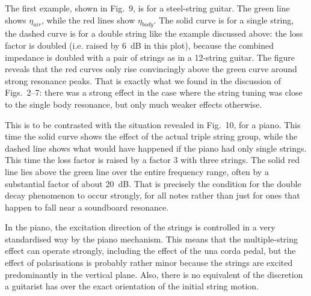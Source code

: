   The first example, shown in Fig.\ 9, is for a steel-string guitar. The green 
  line shows $\eta_{air}$, while the red lines show $\eta_{body}$. The solid 
  curve is for a single string, the dashed curve is for a double string like 
  the example discussed above: the loss factor is doubled (i.e. raised by 6~dB 
  in this plot), because the combined impedance is doubled with a pair of 
  strings as in a 12-string guitar. The figure reveals that the red curves only 
  rise convincingly above the green curve around strong resonance peaks. That 
  is exactly what we found in the discussion of Figs.\ 2--7: there was a strong 
  effect in the case where the string tuning was close to the single body 
  resonance, but only much weaker effects otherwise. 


  This is to be contrasted with the situation revealed in Fig.\ 10, for a 
  piano. This time the solid curve shows the effect of the actual triple string 
  group, while the dashed line shows what would have happened if the piano had 
  only single strings. This time the loss factor is raised by a factor 3 with 
  three strings. The solid red line lies above the green line over the entire 
  frequency range, often by a substantial factor of about 20~dB. That is 
  precisely the condition for the double decay phenomenon to occur strongly, 
  for all notes rather than just for ones that happen to fall near a soundboard 
  resonance. 


  In the piano, the excitation direction of the strings is controlled in a very 
  standardised way by the piano mechanism. This means that the multiple-string 
  effect can operate strongly, including the effect of the una corda pedal, but 
  the effect of polarisations is probably rather minor because the strings are 
  excited predominantly in the vertical plane. Also, there is no equivalent of 
  the discretion a guitarist has over the exact orientation of the initial 
  string motion. 

